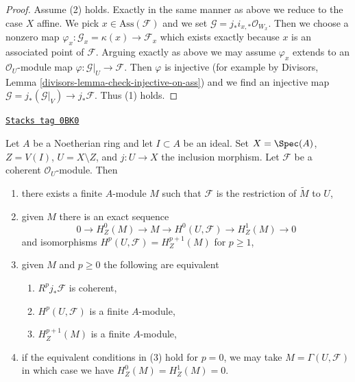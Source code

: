 \begin{proof}
\medskip\noindent
Assume (2) holds. Exactly in the same manner as above we reduce
to the case $X$ affine. We pick $x \in \text{Ass}(\mathcal{F})$
and we set $\mathcal{G} = j_*i_{x, *}\mathcal{O}_{W_x}$.
Then we choose a nonzero map
$\varphi_x : \mathcal{G}_x = \kappa(x) \to \mathcal{F}_x$
which exists exactly because $x$ is an associated point of $\mathcal{F}$.
Arguing exactly as above we may assume $\varphi_x$
extends to an $\mathcal{O}_U$-module map
$\varphi : \mathcal{G}|_U \to \mathcal{F}$.
Then $\varphi$ is injective (for example by
Divisors, Lemma \ref{divisors-lemma-check-injective-on-ass})
and we find an injective map
$\mathcal{G} = j_*(\mathcal{G}|_V) \to j_*\mathcal{F}$.
Thus (1) holds.
\end{proof}

\begin{lemma}
\label{local-cohomology-lemma-finiteness-pushforwards-and-H1-local}
\href{https://stacks.math.columbia.edu/tag/0BK0}{\texttt{Stacks tag 0BK0}}

Let $A$ be a Noetherian ring and let $I \subset A$ be an ideal.
Set $X = \Spec(A)$, $Z = V(I)$, $U = X \setminus Z$, and $j : U \to X$
the inclusion morphism. Let $\mathcal{F}$ be a coherent $\mathcal{O}_U$-module.
Then
\begin{enumerate}
\item there exists a finite $A$-module $M$ such that $\mathcal{F}$ is the
restriction of $\widetilde{M}$ to $U$,
\item given $M$ there is an exact sequence
$$
0 \to H^0_Z(M) \to M \to H^0(U, \mathcal{F}) \to H^1_Z(M) \to 0
$$
and isomorphisms $H^p(U, \mathcal{F}) = H^{p + 1}_Z(M)$ for $p \geq 1$,
\item given $M$ and $p \geq 0$ the following are equivalent
\begin{enumerate}
\item $R^pj_*\mathcal{F}$ is coherent,
\item $H^p(U, \mathcal{F})$ is a finite $A$-module,
\item $H^{p + 1}_Z(M)$ is a finite $A$-module,
\end{enumerate}
\item if the equivalent conditions in (3) hold for $p = 0$, we may take
$M = \Gamma(U, \mathcal{F})$ in which case we have $H^0_Z(M) = H^1_Z(M) = 0$.
\end{enumerate}
\end{lemma}

